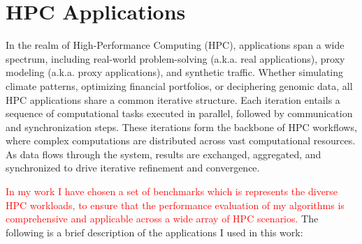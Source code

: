 \section{HPC Applications}
In the realm of High-Performance Computing (HPC), applications span a wide spectrum, including real-world problem-solving (a.k.a. real applications), proxy modeling (a.k.a. proxy applications), and synthetic traffic. Whether simulating climate patterns, optimizing financial portfolios, or deciphering genomic data, all HPC applications share a common iterative structure. Each iteration entails a sequence of computational tasks executed in parallel, followed by communication and synchronization steps. These iterations form the backbone of HPC workflows, where complex computations are distributed across vast computational resources. As data flows through the system, results are exchanged, aggregated, and synchronized to drive iterative refinement and convergence.

\textcolor{red}{In my work I have chosen a set of benchmarks which is represents the diverse HPC workloads, to ensure that the performance evaluation of my algorithms is comprehensive and applicable across a wide array of HPC scenarios.}
The following is a brief description of the applications I used in this work:

